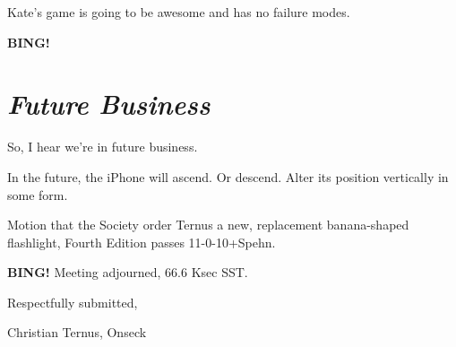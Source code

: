 \documentclass[10pt]{article}
\newcommand{\bing}{{\bf BING!} }
\newcommand{\goto}[1]{\bing \vskip 12pt \section*{{\em{#1}}}}
\begin{document}
Kate's game is going to be awesome and has no failure modes.

\goto{Future Business}

So, I hear we're in future business.

In the future, the iPhone will ascend.  Or descend.  Alter its
position vertically in some form.

Motion that the Society order Ternus a new, replacement banana-shaped
flashlight, Fourth Edition passes 11-0-10+Spehn.

\bing
\noindent
Meeting adjourned, 66.6 Ksec SST.

\vspace{18pt}

\centerline{Respectfully submitted,}
\centerline{Christian Ternus, Onseck}
\end{document}
